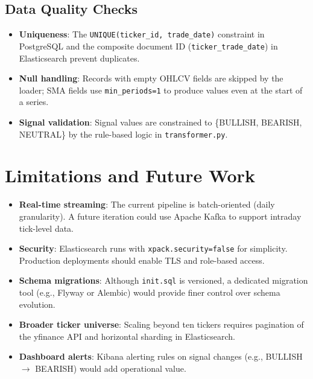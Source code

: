 \documentclass[conference]{IEEEtran}
\begin{document}
\subsection{Data Quality Checks}

\begin{itemize}
  \item \textbf{Uniqueness}: The \texttt{UNIQUE(ticker\_id, trade\_date)}
    constraint in PostgreSQL and the composite document ID
    (\texttt{ticker\_trade\_date}) in Elasticsearch prevent duplicates.
  \item \textbf{Null handling}: Records with empty OHLCV fields are skipped by
    the loader; SMA fields use \texttt{min\_periods=1} to produce values even
    at the start of a series.
  \item \textbf{Signal validation}: Signal values are constrained to
    \{BULLISH, BEARISH, NEUTRAL\} by the rule-based logic in
    \texttt{transformer.py}.
\end{itemize}

\section{Limitations and Future Work}

\begin{itemize}
  \item \textbf{Real-time streaming}: The current pipeline is batch-oriented
    (daily granularity). A future iteration could use Apache Kafka to support
    intraday tick-level data.
  \item \textbf{Security}: Elasticsearch runs with \texttt{xpack.security=false}
    for simplicity. Production deployments should enable TLS and role-based access.
  \item \textbf{Schema migrations}: Although \texttt{init.sql} is versioned,
    a dedicated migration tool (e.g., Flyway or Alembic) would provide finer
    control over schema evolution.
  \item \textbf{Broader ticker universe}: Scaling beyond ten tickers requires
    pagination of the yfinance API and horizontal sharding in Elasticsearch.
  \item \textbf{Dashboard alerts}: Kibana alerting rules on signal changes
    (e.g., BULLISH $\to$ BEARISH) would add operational value.
\end{itemize}

\end{document}
